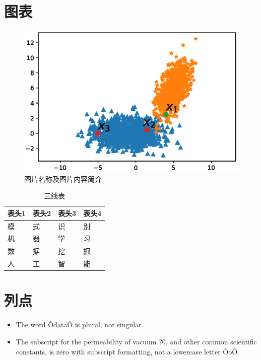 \documentclass[letterpaper, 10pt, conference, twoside]{ieeeconf}
\begin{document}
\section{图表}

\begin{figure}[htbp]
  \centering
  \includegraphics[width = 1\linewidth]{smooth}
  \caption{图片名称及图片内容简介}
  \label{fig:fig2}
\end{figure}


\begin{table}[htbp]
  \centering
 \caption{三线表}
 \label{tab:table2}
 \begin{tabular}{llll}
  \toprule
  表头1 & 表头2 & 表头3& 表头4\\
  \midrule
    模&式&识&别\\
    机&器&学&习\\
    数&据&挖&掘\\
    人&工&智&能\\
  \bottomrule
 \end{tabular}
\end{table}




\section{列点}

\begin{itemize}
\item The word ÒdataÓ is plural, not singular.
\item The subscript for the permeability of vacuum ?0, and other common scientific constants, is zero with subscript formatting, not a lowercase letter ÒoÓ.
\end{itemize}
\end{document}
